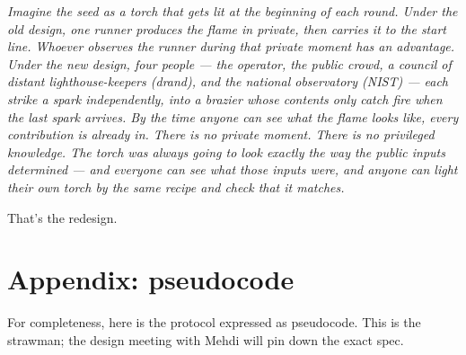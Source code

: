 \documentclass[11pt]{article}
\newenvironment{aside}{\par\medskip\noindent\itshape\small\color{black!70}}{\normalfont\par\medskip}
\begin{document}
\begin{aside}
Imagine the seed as a torch that gets lit at the beginning of each round. Under the old design, one runner produces the flame in private, then carries it to the start line. Whoever observes the runner during that private moment has an advantage. Under the new design, four people --- the operator, the public crowd, a council of distant lighthouse-keepers (drand), and the national observatory (NIST) --- each strike a spark independently, into a brazier whose contents only catch fire when the last spark arrives. By the time anyone can see what the flame looks like, every contribution is already in. There is no private moment. There is no privileged knowledge. The torch was always going to look exactly the way the public inputs determined --- and \emph{everyone} can see what those inputs were, and \emph{anyone} can light their own torch by the same recipe and check that it matches.

That's the redesign.
\end{aside}

\section*{Appendix: pseudocode}

For completeness, here is the protocol expressed as pseudocode. This is the strawman; the design meeting with Mehdi will pin down the exact spec.
\end{document}
